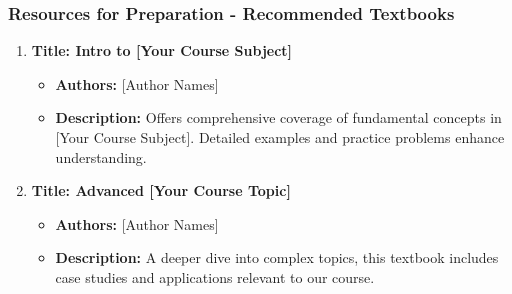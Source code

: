 \documentclass{beamer}
\begin{document}
\begin{frame}[fragile]
    \frametitle{Resources for Preparation - Recommended Textbooks}
    \begin{enumerate}
        \item \textbf{Title: Intro to [Your Course Subject]}
        \begin{itemize}
            \item \textbf{Authors:} [Author Names]
            \item \textbf{Description:} Offers comprehensive coverage of fundamental concepts in [Your Course Subject]. Detailed examples and practice problems enhance understanding.
        \end{itemize}

        \item \textbf{Title: Advanced [Your Course Topic]}
        \begin{itemize}
            \item \textbf{Authors:} [Author Names]
            \item \textbf{Description:} A deeper dive into complex topics, this textbook includes case studies and applications relevant to our course.
        \end{itemize}
    \end{enumerate}
\end{frame}
\end{document}
